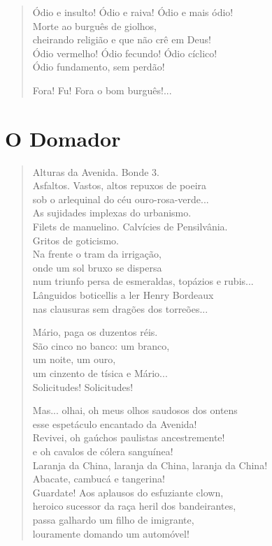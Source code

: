 \begin{verse}
Ódio e insulto! Ódio e raiva! Ódio e mais ódio!\\
Morte ao burguês de giolhos,\\
cheirando religião e que não crê em Deus!\\
Ódio vermelho! Ódio fecundo! Ódio cíclico!\\
Ódio fundamento, sem perdão!

Fora! Fu! Fora o bom burguês!...
\end{verse}

\chapter{O Domador}

\begin{verse}
Alturas da Avenida. Bonde 3.\\
Asfaltos. Vastos, altos repuxos de poeira\\
sob o arlequinal do céu ouro-rosa-verde...\\
As sujidades implexas do urbanismo.\\
Filets de manuelino. Calvícies de Pensilvânia.\\
Gritos de goticismo.\\
Na frente o tram da irrigação,\\
onde um sol bruxo se dispersa\\
num triunfo persa de esmeraldas, topázios e rubis...\\
Lânguidos boticellis a ler Henry Bordeaux\\
nas clausuras sem dragões dos torreões...

Mário, paga os duzentos réis.\\
São cinco no banco: um branco,\\
um noite, um ouro,\\
um cinzento de tísica e Mário...\\
Solicitudes! Solicitudes!

Mas... olhai, oh meus olhos saudosos dos ontens\\
esse espetáculo encantado da Avenida!\\
Revivei, oh gaúchos paulistas ancestremente!\\
e oh cavalos de cólera sanguínea!\\
Laranja da China, laranja da China, laranja da China!\\
Abacate, cambucá e tangerina!\\
Guardate! Aos aplausos do esfuziante clown,\\
heroico sucessor da raça heril dos bandeirantes,\\
passa galhardo um filho de imigrante,\\
louramente domando um automóvel!
\end{verse}

